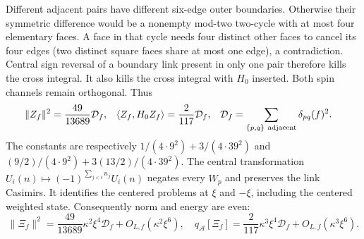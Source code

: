 Different adjacent pairs have different six-edge outer boundaries.
Otherwise their symmetric difference would be a nonempty mod-two
two-cycle with at most four elementary faces. A face in that cycle
needs four distinct other faces to cancel its four edges (two distinct
square faces share at most one edge), a contradiction.
Central sign reversal of a boundary link present in only one pair
therefore kills the cross integral. It also kills the cross integral
with $H_0$ inserted. Both spin channels remain orthogonal. Thus
\begin{align}
 \|Z_f\|^2&=\frac{49}{13689}\mathcal D_f,&
 \langle Z_f,H_0Z_f\rangle&=\frac2{117}\mathcal D_f,&
 \mathcal D_f&=\sum_{\{p,q\}\ {\rm adjacent}}\delta_{pq}(f)^2 .
 \label{eq:fabel-D-moments}
\end{align}
The constants are respectively $1/(4\cdot9^2)+3/(4\cdot39^2)$ and
$(9/2)/(4\cdot9^2)+3(13/2)/(4\cdot39^2)$.
The central transformation
$U_i(n)\mapsto(-1)^{\sum_{j<i}n_j}U_i(n)$ negates every $W_p$ and
preserves the link Casimirs. It identifies the centered problems at
$\xi$ and $-\xi$, including the centered weighted state.
Consequently norm and energy are even:
\begin{equation}\label{eq:fabel-first-moments}
 \|\Xi_f\|^2=\frac{49}{13689}\kappa^2\xi^4\mathcal D_f+
 O_{L,f}(\kappa^2\xi^6),\quad
 q_{\mathcal A}[\Xi_f]=\frac2{117}\kappa^3\xi^4\mathcal D_f+
 O_{L,f}(\kappa^3\xi^6).
\end{equation}


